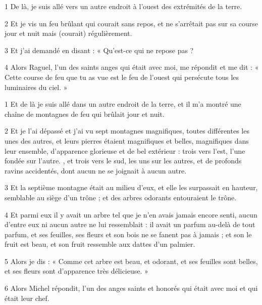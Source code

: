 
\par 1 De là, je suis allé vers un autre endroit à l'ouest des extrémités de la terre.
\par 2 Et je vis un feu brûlant qui courait sans repos, et ne s'arrêtait pas sur sa course jour et nuit mais (courait) régulièrement.
\par 3 Et j'ai demandé en disant : « Qu'est-ce qui ne repose pas ?
\par 4 Alors Raguel, l'un des saints anges qui était avec moi, me répondit et me dit : « Cette course de feu que tu as vue est le feu de l'ouest qui persécute tous les luminaires du ciel. »


\par 1 Et de là je suis allé dans un autre endroit de la terre, et il m'a montré une chaîne de montagnes de feu qui brûlait jour et nuit.
\par 2 Et je l'ai dépassé et j'ai vu sept montagnes magnifiques, toutes différentes les unes des autres, et leurs pierres étaient magnifiques et belles, magnifiques dans leur ensemble, d'apparence glorieuse et de bel extérieur : trois vers l'est, l'une fondée sur l'autre. , et trois vers le sud, les uns sur les autres, et de profonds ravins accidentés, dont aucun ne se joignait à aucun autre.
\par 3 Et la septième montagne était au milieu d'eux, et elle les surpassait en hauteur, semblable au siège d'un trône ; et des arbres odorants entouraient le trône.
\par 4 Et parmi eux il y avait un arbre tel que je n'en avais jamais encore senti, aucun d'entre eux ni aucun autre ne lui ressemblait : il avait un parfum au-delà de tout parfum, et ses feuilles, ses fleurs et son bois ne se fanent pas à jamais ; et son le fruit est beau, et son fruit ressemble aux dattes d'un palmier.
\par 5 Alors je dis : « Comme cet arbre est beau, et odorant, et ses feuilles sont belles, et ses fleurs sont d'apparence très délicieuse. »
\par 6 Alors Michel répondit, l'un des anges saints et honorés qui était avec moi et qui était leur chef.



